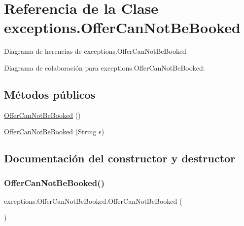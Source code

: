 \hypertarget{classexceptions_1_1_offer_can_not_be_booked}{}\section{Referencia de la Clase exceptions.\+Offer\+Can\+Not\+Be\+Booked}
\label{classexceptions_1_1_offer_can_not_be_booked}


Diagrama de herencias de exceptions.\+Offer\+Can\+Not\+Be\+Booked


Diagrama de colaboración para exceptions.\+Offer\+Can\+Not\+Be\+Booked\+:
\subsection*{Métodos públicos}
\begin{DoxyCompactItemize}
\item 
\mbox{\hyperlink{classexceptions_1_1_offer_can_not_be_booked_a113511bf6eedf993448d483ff55cabb0}{Offer\+Can\+Not\+Be\+Booked}} ()
\item 
\mbox{\hyperlink{classexceptions_1_1_offer_can_not_be_booked_a08f25182868a230f2b49b37483560486}{Offer\+Can\+Not\+Be\+Booked}} (String s)
\end{DoxyCompactItemize}


\subsection{Documentación del constructor y destructor}
\mbox{\label{classexceptions_1_1_offer_can_not_be_booked_a113511bf6eedf993448d483ff55cabb0}} 
\subsubsection{\texorpdfstring{OfferCanNotBeBooked()}{OfferCanNotBeBooked()}\hspace{0.1cm}{\footnotesize\ttfamily [1/2]}}
{\footnotesize\ttfamily exceptions.\+Offer\+Can\+Not\+Be\+Booked.\+Offer\+Can\+Not\+Be\+Booked (\begin{DoxyParamCaption}{ }\end{DoxyParamCaption})}

